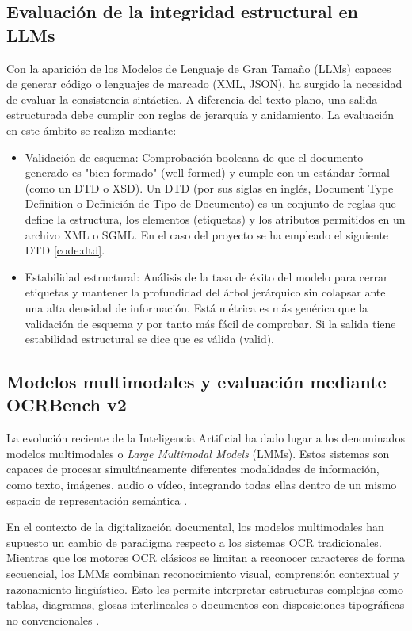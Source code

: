 \subsection{Evaluación de la integridad estructural en LLMs}

Con la aparición de los Modelos de Lenguaje de Gran Tamaño (LLMs) capaces de generar código o lenguajes de marcado (XML, JSON), ha surgido la necesidad de evaluar la consistencia sintáctica. A diferencia del texto plano, una salida estructurada debe cumplir con reglas de jerarquía y anidamiento. La evaluación en este ámbito se realiza mediante:

\begin{itemize}
    \item Validación de esquema: Comprobación booleana de que el documento generado es "bien formado" (well formed) y cumple con un estándar formal (como un DTD o XSD). Un DTD (por sus siglas en inglés, Document Type Definition o Definición de Tipo de Documento) es un conjunto de reglas que define la estructura, los elementos (etiquetas) y los atributos permitidos en un archivo XML o SGML. En el caso del proyecto se ha empleado el siguiente DTD \ref{code:dtd}.
    \item Estabilidad estructural: Análisis de la tasa de éxito del modelo para cerrar etiquetas y mantener la profundidad del árbol jerárquico sin colapsar ante una alta densidad de información. Está métrica es más genérica que la validación de esquema y por tanto más fácil de comprobar. Si la salida tiene estabilidad estructural se dice que es válida (valid).
\end{itemize}

\subsection{Modelos multimodales y evaluación mediante OCRBench v2}

La evolución reciente de la Inteligencia Artificial ha dado lugar a los denominados modelos multimodales o \textit{Large Multimodal Models} (LMMs). Estos sistemas son capaces de procesar simultáneamente diferentes modalidades de información, como texto, imágenes, audio o vídeo, integrando todas ellas dentro de un mismo espacio de representación semántica \parencite{app14125068}.

En el contexto de la digitalización documental, los modelos multimodales han supuesto un cambio de paradigma respecto a los sistemas OCR tradicionales. Mientras que los motores OCR clásicos se limitan a reconocer caracteres de forma secuencial, los LMMs combinan reconocimiento visual, comprensión contextual y razonamiento lingüístico. Esto les permite interpretar estructuras complejas como tablas, diagramas, glosas interlineales o documentos con disposiciones tipográficas no convencionales \parencite{ye2023ureader}.

